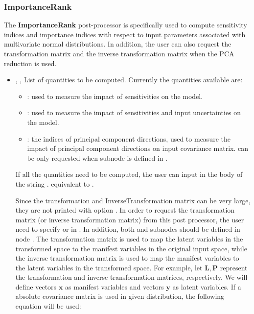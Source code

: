 \subsubsection{ImportanceRank}
\label{ImportanceRank}
The \textbf{ImportanceRank} post-processor is specifically used
to compute sensitivity indices and importance indices with respect to input parameters
associated with multivariate normal distributions. In addition, the user can also request the transformation
matrix and the inverse transformation matrix when the PCA reduction is used.
%
%
\begin{itemize}
  \item {}, ,
  List of quantities to be computed.
  Currently the quantities available are:
  \begin{itemize}
    \item {}: used to measure the impact of sensitivities on the model.
    \item {}: used to measure the impact of sensitivities and input uncertainties on the model.
    \item {}: the indices of principal component directions, used to measure the impact
    of principal component directions on input covariance matrix.
    \nb {} can be only requested when subnode  is defined in .
  \end{itemize}
  If all the quantities need to be computed, the user can input in the body of  the string .
  \nb {} equivalent to .
  
  Since the transformation and InverseTransformation matrix can be very large, they are not printed with option .
  In order to request the transformation matrix (or inverse transformation matrix) from this post processor,
  the user need to specify  or  in . In addition,
  both   and  subnodes should be defined in node . The transformation matrix
  is used to map the latent variables in the transformed space to the manifest variables in the original input space, while the inverse transformation
  matrix is used to map the manifest variables to the latent variables in the transformed space. For example, let $\mathbf{L, P}$ represent
  the transformation and inverse transformation matrices, respectively. We will define vectors $\mathbf x$ as manifest variables and vectors $\mathbf y$
  as latent variables. If a absolute covariance matrix is used in given distribution, the following equation will be used:


\end{itemize}
